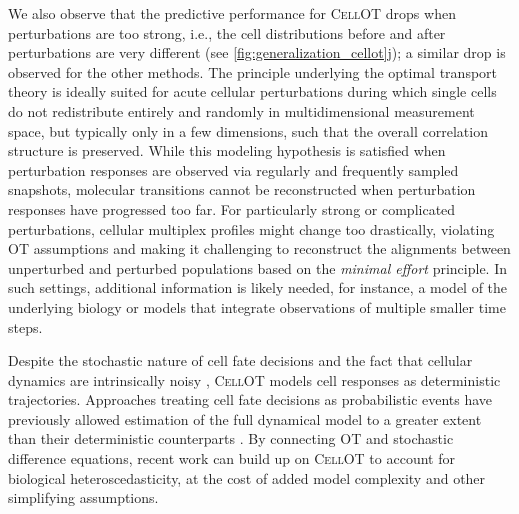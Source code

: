\smallskip

We also observe that the predictive performance for \textsc{CellOT} drops when perturbations are too strong, i.e., the cell distributions before and after perturbations are very different (see \cref{fig:generalization_cellot}j); a similar drop is observed for the other methods.
The principle underlying the optimal transport theory is ideally suited for acute cellular perturbations during which single cells do not redistribute entirely and randomly in multidimensional measurement space, but typically only in a few dimensions, such that the overall correlation structure is preserved. While this modeling hypothesis is satisfied when perturbation responses are observed via regularly and frequently sampled snapshots, molecular transitions cannot be reconstructed when perturbation responses have progressed too far. For particularly strong or complicated perturbations, cellular multiplex profiles might change too drastically, violating OT assumptions and making it challenging to reconstruct the alignments between unperturbed and perturbed populations based on the \emph{minimal effort} principle.
In such settings, additional information is likely needed, for instance, a model of the underlying biology or models that integrate observations of multiple smaller time steps. 

 Despite the stochastic nature of cell fate decisions and the fact that cellular dynamics are intrinsically noisy \citep{wilkinson2009stochastic}, \textsc{CellOT} models cell responses as deterministic trajectories. Approaches treating cell fate decisions as probabilistic events have previously allowed estimation of the full dynamical model to a greater extent than their deterministic counterparts \citep{bergen2020generalizing}.
By connecting OT and stochastic difference equations, recent work \citep{bunne2022recovering, somnath2023aligned} can build up on \textsc{CellOT} to account for biological heteroscedasticity,
at the cost of added model complexity and other simplifying assumptions.

